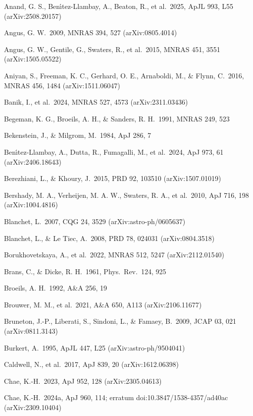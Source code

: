 \documentclass[
  10pt,
]{article}
\begin{document}
{\small
\begin{list}{}{\setlength{\leftmargin}{1.5em}\setlength{\itemindent}{-1.5em}\setlength{\itemsep}{1pt}\setlength{\parsep}{0pt}}
\item Anand, G. S., Ben\'{\i}tez-Llambay, A., Beaton, R., et al.\ 2025, ApJL 993, L55 (arXiv:2508.20157)
\item Angus, G. W.\ 2009, MNRAS 394, 527 (arXiv:0805.4014)
\item Angus, G. W., Gentile, G., Swaters, R., et al.\ 2015, MNRAS 451, 3551 (arXiv:1505.05522)
\item Aniyan, S., Freeman, K. C., Gerhard, O. E., Arnaboldi, M., \& Flynn, C.\ 2016, MNRAS 456, 1484 (arXiv:1511.06047)
\item Banik, I., et al.\ 2024, MNRAS 527, 4573 (arXiv:2311.03436)
\item Begeman, K. G., Broeils, A. H., \& Sanders, R. H.\ 1991, MNRAS 249, 523
\item Bekenstein, J., \& Milgrom, M.\ 1984, ApJ 286, 7
\item Ben\'{\i}tez-Llambay, A., Dutta, R., Fumagalli, M., et al.\ 2024, ApJ 973, 61 (arXiv:2406.18643)
\item Berezhiani, L., \& Khoury, J.\ 2015, PRD 92, 103510 (arXiv:1507.01019)
\item Bershady, M. A., Verheijen, M. A. W., Swaters, R. A., et al.\ 2010, ApJ 716, 198 (arXiv:1004.4816)
\item Blanchet, L.\ 2007, CQG 24, 3529 (arXiv:astro-ph/0605637)
\item Blanchet, L., \& Le Tiec, A.\ 2008, PRD 78, 024031 (arXiv:0804.3518)
\item Borukhovetskaya, A., et al.\ 2022, MNRAS 512, 5247 (arXiv:2112.01540)
\item Brans, C., \& Dicke, R. H.\ 1961, Phys.\ Rev.\ 124, 925
\item Broeils, A. H.\ 1992, A\&A 256, 19
\item Brouwer, M. M., et al.\ 2021, A\&A 650, A113 (arXiv:2106.11677)
\item Bruneton, J.-P., Liberati, S., Sindoni, L., \& Famaey, B.\ 2009, JCAP 03, 021 (arXiv:0811.3143)
\item Burkert, A.\ 1995, ApJL 447, L25 (arXiv:astro-ph/9504041)
\item Caldwell, N., et al.\ 2017, ApJ 839, 20 (arXiv:1612.06398)
\item Chae, K.-H.\ 2023, ApJ 952, 128 (arXiv:2305.04613)
\item Chae, K.-H.\ 2024a, ApJ 960, 114; erratum doi:10.3847/1538-4357/ad40ac (arXiv:2309.10404)

\end{list}}
\end{document}
